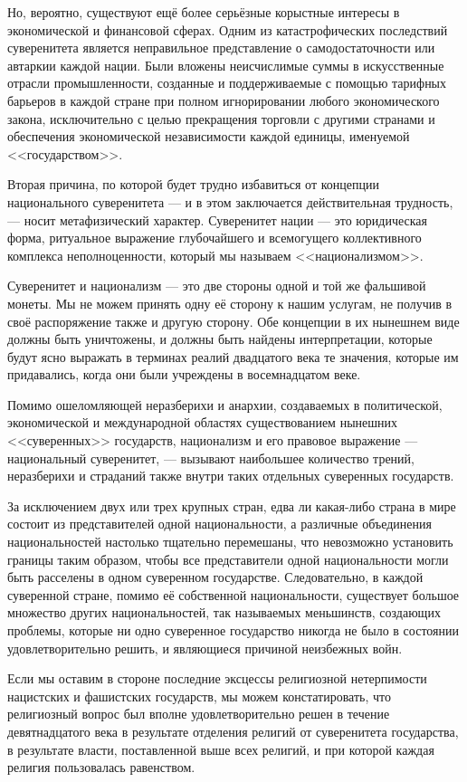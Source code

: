 Но, вероятно, существуют ещё более серьёзные корыстные интересы в экономической и финансовой сферах. Одним из катастрофических последствий суверенитета является неправильное представление о самодостаточности или автаркии каждой нации. Были вложены неисчислимые суммы в искусственные отрасли промышленности, созданные и поддерживаемые с помощью тарифных барьеров в каждой стране при полном игнорировании любого экономического закона, исключительно с целью прекращения торговли с другими странами и обеспечения экономической независимости каждой единицы, именуемой <<государством>>.

Вторая причина, по которой будет трудно избавиться от концепции национального суверенитета — и в этом заключается действительная трудность, — носит метафизический характер. Суверенитет нации — это юридическая форма, ритуальное выражение глубочайшего и всемогущего коллективного комплекса неполноценности, который мы называем <<национализмом>>.

Суверенитет и национализм — это две стороны одной и той же фальшивой монеты. Мы не можем принять одну её сторону к нашим услугам, не получив в своё распоряжение также и другую сторону. Обе концепции в их нынешнем виде должны быть уничтожены, и должны быть найдены интерпретации, которые будут ясно выражать в терминах реалий двадцатого века те значения, которые им придавались, когда они были учреждены в восемнадцатом веке.

Помимо ошеломляющей неразберихи и анархии, создаваемых в политической, экономической и международной областях существованием нынешних <<суверенных>> государств, национализм и его правовое выражение — национальный суверенитет, — вызывают наибольшее количество трений, неразберихи и страданий также внутри таких отдельных суверенных государств.

За исключением двух или трех крупных стран, едва ли какая-либо страна в мире состоит из представителей одной национальности, а различные объединения национальностей настолько тщательно перемешаны, что невозможно установить границы таким образом, чтобы все представители одной национальности могли быть расселены в одном суверенном государстве. Следовательно, в каждой суверенной стране, помимо её собственной национальности, существует большое множество других национальностей, так называемых меньшинств, создающих проблемы, которые ни одно суверенное государство никогда не было в состоянии удовлетворительно решить, и являющиеся причиной неизбежных войн.

Если мы оставим в стороне последние эксцессы религиозной нетерпимости нацистских и фашистских государств, мы можем констатировать, что религиозный вопрос был вполне удовлетворительно решен в течение девятнадцатого века в результате отделения религий от суверенитета государства, в результате власти, поставленной выше всех религий, и при которой каждая религия пользовалась равенством.

